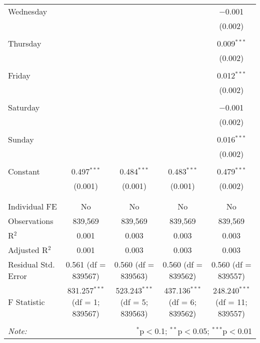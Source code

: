 \documentclass[
]{article}
\begin{document}
\begin{table}[!htbp]
{\begin{tabular}{@{\extracolsep{5pt}}lcccc}
 Wednesday &  &  &  & $-$0.001 \\ 
  &  &  &  & (0.002) \\ 
  & & & & \\ 
 Thursday &  &  &  & 0.009$^{***}$ \\ 
  &  &  &  & (0.002) \\ 
  & & & & \\ 
 Friday &  &  &  & 0.012$^{***}$ \\ 
  &  &  &  & (0.002) \\ 
  & & & & \\ 
 Saturday &  &  &  & $-$0.001 \\ 
  &  &  &  & (0.002) \\ 
  & & & & \\ 
 Sunday &  &  &  & 0.016$^{***}$ \\ 
  &  &  &  & (0.002) \\ 
  & & & & \\ 
 Constant & 0.497$^{***}$ & 0.484$^{***}$ & 0.483$^{***}$ & 0.479$^{***}$ \\ 
  & (0.001) & (0.001) & (0.001) & (0.002) \\ 
  & & & & \\ 
\hline \\[-1.8ex] 
Individual FE & No & No & No & No \\ 
Observations & 839,569 & 839,569 & 839,569 & 839,569 \\ 
R$^{2}$ & 0.001 & 0.003 & 0.003 & 0.003 \\ 
Adjusted R$^{2}$ & 0.001 & 0.003 & 0.003 & 0.003 \\ 
Residual Std. Error & 0.561 (df = 839567) & 0.560 (df = 839563) & 0.560 (df = 839562) & 0.560 (df = 839557) \\ 
F Statistic & 831.257$^{***}$ (df = 1; 839567) & 523.243$^{***}$ (df = 5; 839563) & 437.136$^{***}$ (df = 6; 839562) & 248.240$^{***}$ (df = 11; 839557) \\ 
\hline 
\hline \\[-1.8ex] 
\textit{Note:}  & \multicolumn{4}{r}{$^{*}$p$<$0.1; $^{**}$p$<$0.05; $^{***}$p$<$0.01} \\ 
\end{tabular}
} 
\end{table} 
\newpage
\end{document}
